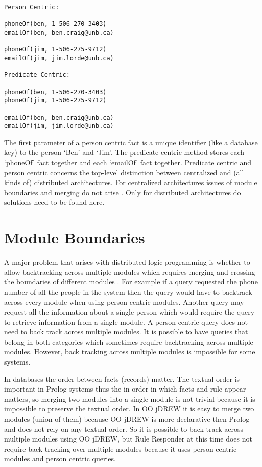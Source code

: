 \documentclass[12pt]{report}
\begin{document}
\singlespacing
\begin{verbatim} 
Person Centric:

phoneOf(ben, 1-506-270-3403)
emailOf(ben, ben.craig@unb.ca)

phoneOf(jim, 1-506-275-9712)
emailOf(jim, jim.lorde@unb.ca)

Predicate Centric:

phoneOf(ben, 1-506-270-3403)
phoneOf(jim, 1-506-275-9712)

emailOf(ben, ben.craig@unb.ca)
emailOf(jim, jim.lorde@unb.ca)
\end{verbatim}
\doublespacing                    
The first parameter of a person centric fact is a unique identifier (like a database key) to the person `Ben' and `Jim'.  The predicate centric method stores each `phoneOf' fact together and each `emailOf' fact together.  Predicate centric and person centric concerns the top-level distinction between centralized and (all kinds of) distributed architectures.  For centralized architectures issues of module boundaries and merging do not arise \cite{Modularity}.  Only for distributed architectures do solutions need to be found here.

\section{Module Boundaries}

A major problem that arises with distributed logic programming is whether to allow backtracking across multiple modules which requires merging and crossing the boundaries of different modules \cite{Modularity}.  For example if a query requested the phone number of all the people in the system then the query would have to backtrack across every module when using person centric modules.  Another query may request all the information about a single person which would require the query to retrieve information from a single module.  A person centric query does not need to back track across multiple modules.  It is possible to have queries that belong in both categories which sometimes require backtracking across multiple modules.  However, back tracking across multiple modules is impossible for some systems. 

In databases the order between facts (records) matter.  The textual order is important in Prolog systems thus the in order in which facts and rule appear matters, so merging two modules into a single module is not trivial because it is impossible to preserve the textual order.  In OO jDREW it is easy to merge two modules (union of them) because OO jDREW is more declarative then Prolog and does not rely on any textual order.  So it is possible to back track across multiple modules using OO jDREW, but Rule Responder at this time does not require back tracking over multiple modules because it uses person centric modules and person centric queries.
\end{document}
